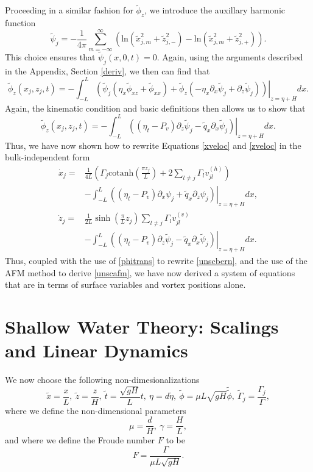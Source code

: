 \documentclass[a4paper,11pt]{article}
\newcommand{\p}{\partial}
\begin{document}
Proceeding in a similar fashion for $\tilde{\phi}_{z}$, we introduce the auxillary harmonic function
\[
\tilde{\psi}_{j} = -\frac{1}{4\pi}\sum_{m=-\infty}^{\infty} \left( \mbox{ln}\left( \tilde{x}_{j,m}^{2} + \tilde{z}_{j,-}^{2}  \right) - \mbox{ln}\left( \tilde{x}_{j,m}^{2} + \tilde{z}_{j,+}^{2} \right)\right).
\]
This choice ensures that $\tilde{\psi}_{j}(x,0,t) = 0$.  Again, using the arguments described in the Appendix, Section \ref{deriv}, we then can find that
\[
\tilde{\phi}_{z}(x_{j},z_{j},t) = -\int_{-L}^{L}\left.\left( \tilde{\psi}_{j}\left(\eta_{x}\tilde{\phi}_{xz}+\tilde{\phi}_{xx}\right)+\tilde{\phi}_{z}\left(-\eta_{x}\p_{x}\tilde{\psi}_{j}+\p_{z}\tilde{\psi}_{j}\right) \right)\right|_{z=\eta+H} dx.
\]
Again, the kinematic condition and basic definitions then allows us to show that
\[
\tilde{\phi}_{z}(x_{j},z_{j},t) = -\int_{-L}^{L}\left.\left( \left(\eta_{t}-P_{v}\right)\p_{z}\tilde{\psi}_{j} - \tilde{q}_{x}\p_{x}\tilde{\psi}_{j} \right)\right|_{z=\eta+H} dx.
\]
Thus, we have now shown how to rewrite Equations \eqref{xveloc} and \eqref{zveloc} in the bulk-independent form 
\begin{align}
\dot{x}_{j} = & \frac{1}{4L}\left(  \Gamma_{j}\mbox{cotanh}\left(\frac{\pi z_{j}}{L} \right)+2\sum_{l\neq j}\Gamma_{l}v_{jl}^{(h)} \right)\nonumber\\
&  -\int_{-L}^{L}\left.\left(\left(\eta_{t}-P_{v}\right)\p_{x}\psi_{j} + \tilde{q}_{x}\p_{z}\psi_{j} \right)\right|_{z=\eta + H} dx, \label{xdotb}\\
\dot{z}_{j} = &  \frac{1}{2L}\sinh\left(\frac{\pi}{L}z_{j}\right)\sum_{l\neq j} \Gamma_{l} v_{jl}^{(v)}\nonumber\\
& - \int_{-L}^{L}\left.\left( \left(\eta_{t}-P_{v}\right)\p_{z}\tilde{\psi}_{j} - \tilde{q}_{x}\p_{x}\tilde{\psi}_{j} \right)\right|_{z=\eta + H} dx. \label{zdotb}
\end{align}
Thus, coupled with the use of \eqref{phitrans} to rewrite \eqref{unscbern}, and the use of the AFM method to derive \eqref{unscafm}, we have now derived a system of equations that are in terms of surface variables and vortex positions alone.  
\section{Shallow Water Theory: Scalings and Linear Dynamics}
We now choose the following non-dimesionalizations 
\[
\tilde{x} = \frac{x}{L}, ~\tilde{z} = \frac{z}{H}, ~ \tilde{t} = \frac{\sqrt{gH}}{L} t, ~ \eta = d\tilde{\eta}, ~ \tilde{\phi} = \mu L\sqrt{gH} \tilde{\tilde{\phi}}, ~ \tilde{\Gamma}_{j} = \frac{\Gamma_{j}}{\Gamma},
\]
where we define the non-dimensional parameters
\[
\mu= \frac{d}{H}, ~ \gamma = \frac{H}{L},
\]
and where we define the Froude number $F$ to be 
\[
F = \frac{\Gamma}{\mu L \sqrt{gH}}.
\]
\end{document}
